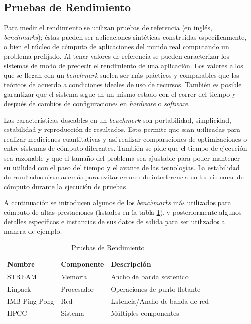 \documentclass[a4paper]{report}
\begin{document}
\subsection{Pruebas de Rendimiento}

Para medir el rendimiento se utilizan pruebas de referencia (en inglés, {\em benchmarks}); éstas pueden ser aplicaciones sintéticas construidas específicamente, o bien el núcleo de cómputo de aplicaciones del mundo real computando un problema prefijado. Al tener valores de referencia se pueden caracterizar los sistemas de modo de predecir el rendimiento de una aplicación.
Los valores a los que se llegan con un {\it benchmark} suelen ser más prácticos y comparables que los teóricos de acuerdo a condiciones ideales de uso de recursos.
También es posible garantizar que el sistema sigue en un mismo estado con el correr del tiempo y después de cambios de configuraciones en {\it hardware} o {\it software}.

\bigskip

Las características deseables en un {\it benchmark} son portabilidad, simplicidad, estabilidad y reproducción de resultados. Esto permite que sean utilizadas para realizar mediciones cuantitativas y así realizar comparaciones de optimizaciones o entre sistemas de cómputo diferentes. También se pide que el tiempo de ejecución sea razonable y que el tamaño del problema sea ajustable para poder mantener su utilidad con el paso del tiempo y el avance de las tecnologías. La estabilidad de resultados sirve además para evitar errores de interferencia en los sistemas de cómputo durante la ejecución de pruebas.

\bigskip

A continuación se introducen algunos de los {\it benchmarks} más utilizados para cómputo de altas prestaciones (listados en la tabla \ref{table:benchmark-list}),
y posteriormente algunos detalles específicos e instancias de sus datos de salida para ser utilizados a manera de ejemplo.

\begin{table}[H]
    \caption{Pruebas de Rendimiento}
    \centering
    \begin{tabular}{|l|l|l|}\hline
      {\bf Nombre} & {\bf Componente} & {\bf Descripción} \\ \hline
      STREAM & Memoria & Ancho de banda sostenido \\ \hline
      Linpack & Procesador & Operaciones de punto flotante \\ \hline
      IMB Ping Pong & Red & Latencia/Ancho de banda de red \\ \hline
      HPCC & Sistema & Múltiples componentes \\ \hline
        \end{tabular}
  \label{table:benchmark-list}
\end{table}
\end{document}
